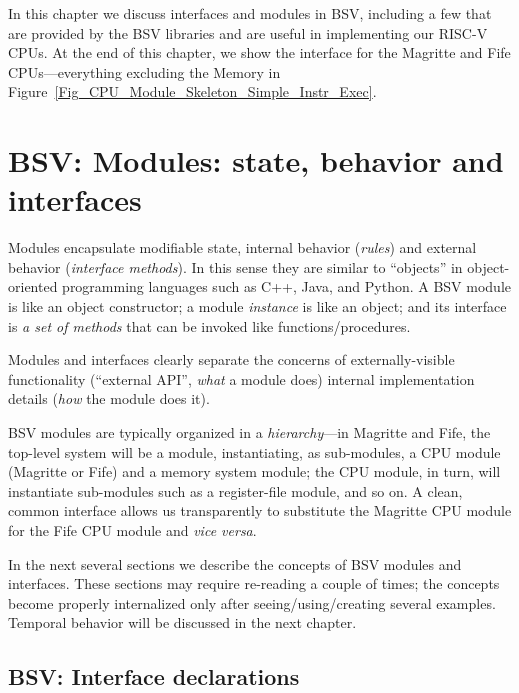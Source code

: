 In this chapter we discuss interfaces and modules in BSV, including a
few that are provided by the BSV libraries and are useful in
implementing our RISC-V CPUs.  At the end of this chapter, we show the
interface for the Magritte and Fife CPUs---everything excluding the
Memory in Figure~\ref{Fig_CPU_Module_Skeleton_Simple_Instr_Exec}.


\section{BSV: Modules: state, behavior and interfaces}

\label{Sec_CPU_Module_Skeleton_Modules}


Modules encapsulate modifiable state, internal behavior (\emph{rules})
and external behavior (\emph{interface methods}).  In this sense they
are similar to ``objects'' in object-oriented programming languages
such as C++, Java, and Python.  A BSV module is like an object
constructor; a module \emph{instance} is like an object; and its
interface is \emph{a set of methods} that can be invoked like
functions/procedures.

Modules and interfaces clearly separate the concerns of
externally-visible functionality (``external API'', \emph{what} a
module does) {\vs} internal implementation details (\emph{how} the
module does it).

BSV modules are typically organized in a \emph{hierarchy}---in
Magritte and Fife, the top-level system will be a module,
instantiating, as sub-modules, a CPU module (Magritte or Fife) and a
memory system module; the CPU module, in turn, will instantiate
sub-modules such as a register-file module, and so on.  A clean,
common interface allows us transparently to substitute the Magritte
CPU module for the Fife CPU module and \emph{vice versa}.

In the next several sections we describe the concepts of BSV modules
and interfaces.  These sections may require re-reading a couple of
times; the concepts become properly internalized only after
seeing/using/creating several examples.  Temporal behavior will be
discussed in the next chapter.


\subsection{BSV: Interface declarations}

